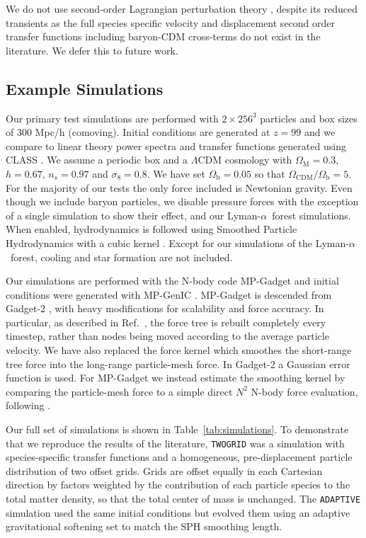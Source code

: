 \documentclass[a4paper,11pt]{article}
\newcommand{\Lya}{Lyman-$\alpha$}
\begin{document}
We do not use second-order Lagrangian perturbation theory \cite{Scoccimarro:1998}, despite its reduced transients as the full species specific velocity and displacement second order transfer functions including baryon-CDM cross-terms do not exist in the literature. We defer this to future work.

\subsection{Example Simulations}
\label{sec:simulations}

Our primary test simulations are performed with $2\times 256^3$ particles and box sizes of $300$ Mpc/h (comoving). Initial conditions are generated at $z=99$ and we compare to linear theory power spectra and transfer functions generated using CLASS \cite{CLASS}. We assume a periodic box and a $\Lambda$CDM cosmology with $\Omega_\mathrm{M} = 0.3$, $h = 0.67$, $n_s = 0.97$ and $\sigma_8 = 0.8$. We have set $\Omega_\mathrm{b} = 0.05$ so that $\Omega_{\mathrm{CDM}}/ \Omega_\mathrm{b} = 5$. For the majority of our tests the only force included is Newtonian gravity. Even though we include baryon particles, we disable pressure forces with the exception of a single simulation to show their effect, and our \Lya~forest simulations. When enabled, hydrodynamics is followed using Smoothed Particle Hydrodynamics with a cubic kernel \cite{Springel:2005}. Except for our simulations of the \Lya~forest, cooling and star formation are not included.

Our simulations are performed with the N-body code MP-Gadget and initial conditions were generated with MP-GenIC \cite{yu_feng_2018_1451799}. MP-Gadget is descended from Gadget-2 \cite{Springel:2005}, with heavy modifications for scalability and force accuracy. In particular, as described in Ref.~\cite{Bird:2018}, the force tree is rebuilt completely every timestep, rather than nodes being moved according to the average particle velocity. We have also replaced the force kernel which smoothes the short-range tree force into the long-range particle-mesh force. In Gadget-2 a Gaussian error function is used. For MP-Gadget we instead estimate the smoothing kernel by comparing the particle-mesh force to a simple direct $N^2$ N-body force evaluation, following \cite{Heitmann:2010}.

Our full set of simulations is shown in Table~\ref{tab:simulations}. To demonstrate that we reproduce the results of the literature, \texttt{TWOGRID} was a simulation with species-specific transfer functions and a homogeneous, pre-displacement particle distribution of two offset grids. Grids are offset equally in each Cartesian direction by factors weighted by the contribution of each particle species to the total matter density, so that the total center of mass is unchanged. The \texttt{ADAPTIVE} simulation used the same initial conditions but evolved them using an adaptive gravitational softening set to match the SPH smoothing length.
\end{document}
